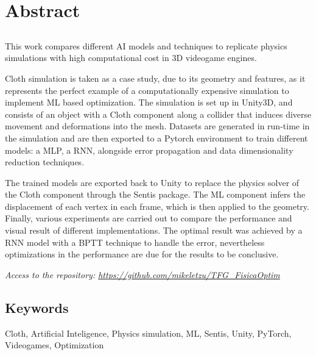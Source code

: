 \chapter*{Abstract}

\section*{\tituloPortadaEngVal}
This work compares different AI models and techniques to replicate physics simulations with high computational cost in 3D videogame engines. \newline

Cloth simulation is taken as a case study, due to its geometry and features, as it represents the perfect example of a computationally expensive simulation to implement ML based optimization. The simulation is set up in Unity3D, and consists of an object with a Cloth component along a collider that induces diverse movement and deformations into the mesh. Datasets are generated in run-time in the simulation and are then exported to a Pytorch environment to train different models: a MLP, a RNN, alongside error propagation and data dimensionality reduction techniques.

The trained models are exported back to Unity to replace the physics solver of the Cloth component through the Sentis package. The ML component infers the displacement of each vertex in each frame, which is then applied to the geometry. Finally, various experiments are carried out to compare the performance and visual result of different implementations. The optimal result was achieved by a RNN model with a BPTT technique to handle the error, nevertheless optimizations in the performance are due for the results to be conclusive.\newline

\textit{Access to the repository: \url{https://github.com/mikeletzu/TFG_FisicaOptim}}

\section*{Keywords}

\noindent Cloth, Artificial Inteligence, Physics simulation, ML, Sentis, Unity, PyTorch, Videogames, Optimization